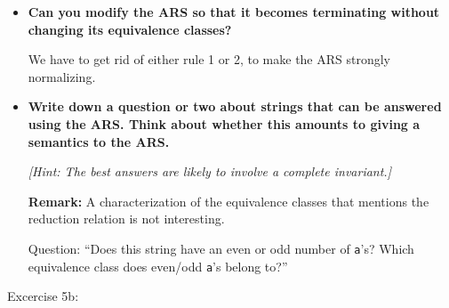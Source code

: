 \documentclass{article}
\theoremstyle{theorem}
\theoremstyle{definition}
\theoremstyle{remark}
\begin{document}
\begin{itemize}
  \item \textbf{Can you modify the ARS so that it becomes terminating without changing its equivalence classes?}

  We have to get rid of either rule 1 or 2, to make the ARS strongly normalizing.

  \item \textbf{Write down a question or two about strings that can be answered using the ARS. Think about whether this amounts to giving a semantics to the ARS.}

  \textit{[Hint: The best answers are likely to involve a complete invariant.]}

  \textbf{Remark:} A characterization of the equivalence classes that mentions the reduction relation is not interesting.

  Question: “Does this string have an even or odd number of \texttt{a}'s? Which equivalence class does even/odd \texttt{a}'s belong to?”
\end{itemize}


Excercise 5b:
\end{document}
